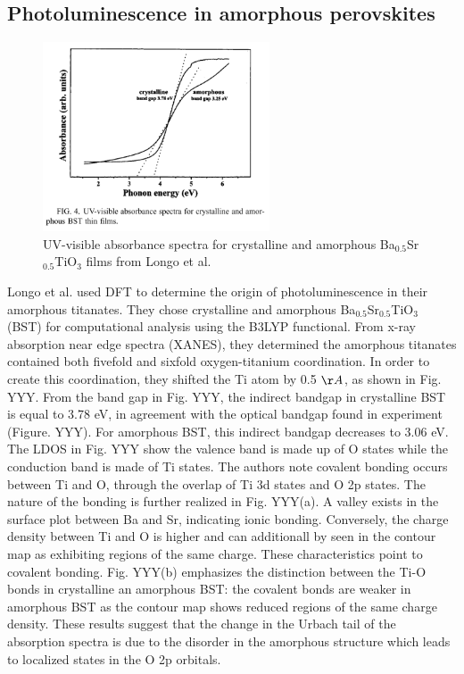 \documentclass[3p,review,12pt]{elsarticle}
\begin{document}
\subsection{Photoluminescence in amorphous perovskites}
\begin{figure}[h]
	\includegraphics[width=0.6\textwidth]{longo3}
	\centering
	\caption{UV-visible absorbance spectra for crystalline and amorphous Ba$_{0.5}$Sr$_{0.5}$TiO$_{3}$ films from Longo et al. \cite{Longo2004}} 
\end{figure}
Longo et al. \cite{Longo2004} used DFT to determine the origin of photoluminescence in their amorphous titanates. They chose  crystalline and amorphous Ba$_{0.5}$Sr$_{0.5}$TiO$_{3}$ (BST) for computational analysis using the B3LYP functional. From x-ray absorption near edge spectra (XANES), they determined the amorphous titanates contained both fivefold and sixfold oxygen-titanium coordination. In order to create this coordination, they shifted the Ti atom by 0.5 $\AA$, as shown in Fig. YYY. From the band gap in Fig. YYY, the indirect bandgap in crystalline BST is equal to 3.78 eV, in agreement with the optical bandgap found in experiment (Figure. YYY). For amorphous BST, this indirect bandgap decreases to 3.06 eV. The LDOS in Fig. YYY show the valence band is made up of O states while the conduction band is made of Ti states. The authors note covalent bonding occurs between Ti and O, through the overlap of Ti 3d states and O 2p states. The nature of the bonding is further realized in Fig. YYY(a). A  valley exists in the surface plot between Ba and Sr, indicating ionic bonding. Conversely, the charge density between Ti and O is higher and can additionall by seen in the contour map as exhibiting regions of the same charge. These characteristics point to covalent bonding. Fig. YYY(b) emphasizes the distinction between the Ti-O bonds in crystalline an amorphous BST: the covalent bonds are weaker in amorphous BST as the contour map shows reduced regions of the same charge density. These results suggest that the change in the Urbach tail of the absorption spectra is due to the disorder in the amorphous structure which leads to localized states in the O 2p orbitals.
\end{document}
